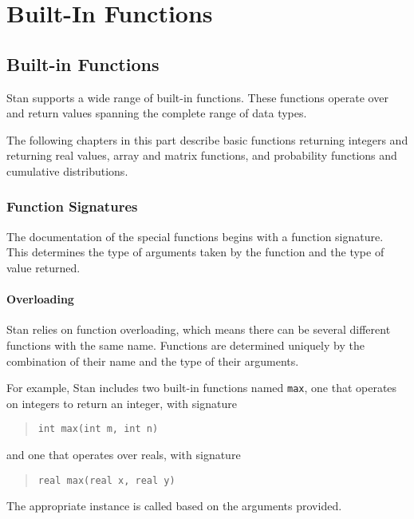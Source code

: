 \documentclass[10pt]{report}
\newcommand{\Stan}{Stan\xspace}
\newcommand{\code}[1]{{\tt #1}}
\begin{document}
\part{Built-In Functions}\label{built-in-functions.part}

\chapter{Built-in Functions}

\Stan supports a wide range of built-in functions.  These functions
operate over and return values spanning the complete range of data
types.  

The following chapters in this part describe basic functions returning
integers and returning real values, array and matrix functions, and
probability functions and cumulative distributions.

\section{Function Signatures}

The documentation of the special functions begins with a function
signature.  This determines the type of arguments taken by the
function and the type of value returned.  

\subsection{Overloading}

\Stan relies on function overloading, which means there can be several
different functions with the same name.  Functions are determined
uniquely by the combination of their name and the type of their
arguments.

For example, \Stan includes two built-in functions named \code{max}, one that
operates on integers to return an integer, with signature
%
\begin{quote}
\begin{Verbatim}
int max(int m, int n)
\end{Verbatim}
\end{quote}
%
and one that operates over reals, with signature
%
\begin{quote}
\begin{Verbatim}
real max(real x, real y)
\end{Verbatim}
\end{quote}
%
The appropriate instance is called based on the arguments provided.
\end{document}
